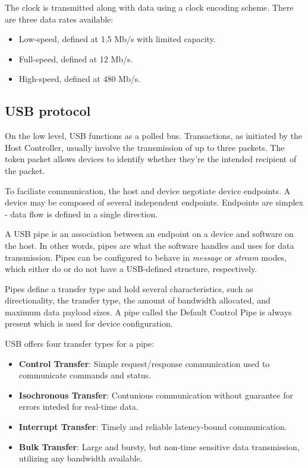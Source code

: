             The clock is transmitted along with data using a clock encoding scheme.  There are three data rates available:
            \begin{itemize}
                \item Low-speed, defined at 1.5 Mb/s with limited capacity.
                \item Full-speed, defined at 12 Mb/s.
                \item High-speed, defined at 480 Mb/s.
            \end{itemize}
        
        \subsection{USB protocol}
            On the low level, USB functions as a polled bus.  Transactions, as initiated by the Host Controller, usually involve the transmission of up to three packets.  The token packet allows devices to identify whether they're the intended recipient of the packet.
            
            To faciliate communication, the host and device negotiate device endpoints.  A device may be composed of several independent endpoints.  Endpoints are simplex - data flow is defined in a single direction.
            
            A USB pipe is an association between an endpoint on a device and software on the host.  In other words, pipes are what the software handles and uses for data transmission.  Pipes can be configured to behave in \emph{message} or \emph{stream} modes, which either do or do not have a USB-defined structure, respectively.
            
            Pipes define a transfer type and hold several characteristics, such as directionality, the transfer type, the amount of bandwidth allocated, and maximum data payload sizes.  A pipe called the Default Control Pipe is always present which is used for device configuration.
            
            
            USB offers four transfer types for a pipe:
            \begin{itemize}
                \item \textbf{Control Transfer}: Simple request/response communication used to communicate commands and status.
                \item \textbf{Isochronous Transfer}: Contunious communication without guarantee for errors inteded for real-time data.
                \item \textbf{Interrupt Transfer}: Timely and reliable latency-bound communication.
                \item \textbf{Bulk Transfer}: Large and bursty, but non-time sensitive data transmission, utilizing any bandwidth available.
            \end{itemize}
            
